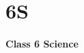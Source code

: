 \label{3 C6 Science}
    \section{6S}
    \begin{frame}
    \begin{center}
    \begin{Huge}
        \textbf{Class 6 Science}
    \end{Huge}
    \end{center}
    \end{frame}
 
    